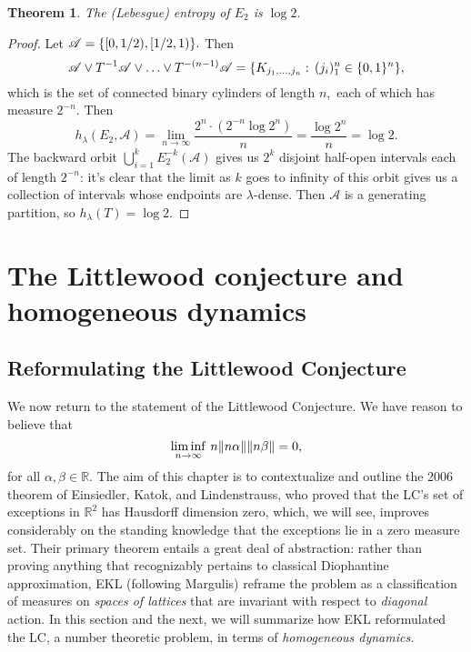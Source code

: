\documentclass[12pt, letterpaper, oneside]{book}
\newcommand{\gl}{\ensuremath{\lambda}}
\newcommand{\R}{\mathbb{R}}
\DeclarePairedDelimiter{\norm}{\lVert}{\rVert}
\DeclarePairedDelimiter{\set}{\lbrace}{\rbrace}
\theoremstyle{plain}
\newtheorem{theorem}{Theorem}
\theoremstyle{definition}
\theoremstyle{remark}
\begin{document}
\begin{theorem}
The (Lebesgue) entropy of $E_2$ is $\log 2.$ 
\end{theorem}
\begin{proof}
Let $\mathscr{A} = \set{[0, 1/2), [1/2, 1)}.$ Then 
\[
\mathscr{A} \lor T^{-1}\mathscr{A} \lor \ldots \lor T^{-(n-1)}\mathscr{A} = \set{K_{j_1, \ldots ,j_n}: \, (j_i)_1^n \in \set{0,1}^n},
\]
which is the set of connected binary cylinders of length $n,$ each of which has measure $2^{-n}.$ Then
\[
h_{\gl}(E_2, \mathscr{A}) = \lim \limits_{n \to \infty} \frac{2^n \cdot (2^{-n} \log 2^n)}{n} = \frac{\log 2^n}{n} = \log 2.
\]
The backward orbit $\bigcup_{i = 1}^{k}E_2^{-k}(\mathscr{A})$ gives us $2^k$ disjoint half-open intervals each of length $2^{-n}$: it's clear that the limit as $k$ goes to infinity of this orbit gives us a collection of intervals whose endpoints are $\gl$-dense. Then $\mathscr{A}$ is a generating partition, so $h_{\gl}(T) = \log 2.$ 
\end{proof}



\chapter[Homogeneous dynamics]{The Littlewood conjecture and homogeneous dynamics}

\section{Reformulating the Littlewood Conjecture}

We now return to the statement of the Littlewood Conjecture. We have reason to believe that 
  \[
  \liminf\limits_{n \to \infty}\,n \norm{n \alpha} \norm{n \beta}  = 0,
   \]
 for all $\alpha, \beta \in \R.$ The aim of this chapter is to contextualize and outline  the 2006 theorem of Einsiedler, Katok, and Lindenstrauss, who proved that the LC's set of exceptions in $\R^2$ has Hausdorff dimension zero, which, we will see, improves considerably on the standing knowledge that the exceptions lie in a zero measure set. Their primary theorem entails a great deal of abstraction: rather than proving anything that recognizably pertains to classical Diophantine approximation, EKL (following Margulis) reframe the problem as a classification of measures on \textit{spaces of lattices} that are invariant with respect to \textit{diagonal} action. In this section and the next, we will summarize how EKL reformulated the LC, a number theoretic problem, in terms of \textit{homogeneous dynamics.}
 
\end{document}
